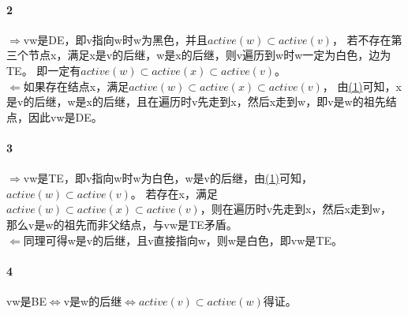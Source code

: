 \documentclass[11pt,a4paper,oneside,oldfontcommands]{ctexart}
\begin{document}
\paragraph*{\textcircled{2}}
\textbf{$\Rightarrow$}vw是DE，即v指向w时w为黑色，并且$active(w)\subset active(v)$，
若不存在第三个节点x，满足x是v的后继，w是x的后继，则v遍历到w时w一定为白色，边为TE。
即一定有$active(w)\subset active(x)\subset active(v)$。\\
\hspace*{20pt}\textbf{$\Leftarrow$}如果存在结点x，满足$active(w)\subset active(x)\subset active(v)$，
由\hyperref[(1)]{(1)}可知，x是v的后继，w是x的后继，且在遍历时v先走到x，然后x走到w，即v是w的祖先结点，因此vw是DE。\\
\paragraph*{\textcircled{3}}
\textbf{$\Rightarrow$}vw是TE，即v指向w时w为白色，w是v的后继，由\hyperref[(1)]{(1)}可知，$active(w)\subset active(v)$。
若存在x，满足$active(w)\subset active(x)\subset active(v)$，则在遍历时v先走到x，然后x走到w，
那么v是w的祖先而非父结点，与vw是TE矛盾。\\
\hspace*{20pt}\textbf{$\Leftarrow$}同理可得w是v的后继，且v直接指向w，则w是白色，即vw是TE。\\
\paragraph*{\textcircled{4}}
vw是BE$\Leftrightarrow$v是w的后继$\Leftrightarrow active(v)\subset active(w)$得证。\\
\end{document}
